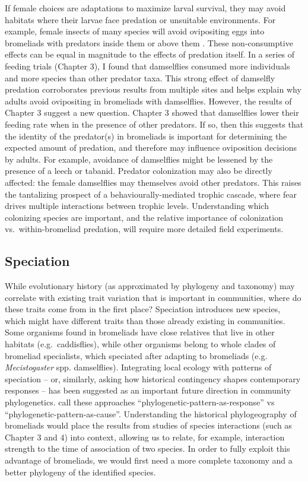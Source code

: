 If female choices are adaptations to maximize larval survival, they may
avoid habitats where their larvae face predation or unsuitable
environments. For example, female insects of many species will avoid
ovipositing eggs into bromeliads with predators inside them
\citep{hammill} or above them \citep{romero&srivastava}. These
non-consumptive effects can be equal in magnitude to the effects of
predation itself. In a series of feeding trials (Chapter 3), I found
that damselflies consumed more individuals and more species than other
predator taxa. This strong effect of damselfly predation corroborates
previous results from multiple sites \citep{ref} and helps explain why
adults avoid ovipositing in bromeliads with damselflies. However, the
results of Chapter 3 suggest a new question. Chapter 3 showed that
damselflies lower their feeding rate when in the presence of other
predators. If so, then this suggests that the identity of the
predator(s) in bromeliads is important for determining the expected
amount of predation, and therefore may influence oviposition decisions
by adults. For example, avoidance of damselflies might be lessened by
the presence of a leech or tabanid. Predator colonization may also be
directly affected: the female damselflies may themselves avoid other
predators. This raises the tantalizing prospect of a
behaviourally-mediated trophic cascade, where fear drives multiple
interactions between trophic levels. Understanding which colonizing
species are important, and the relative importance of colonization
vs.~within-bromeliad predation, will require more detailed field
experiments.

\subsection{Speciation}\label{speciation}

While evolutionary history (as approximated by phylogeny and taxonomy)
may correlate with existing trait variation that is important in
communities, where do these traits come from in the first place?
Speciation introduces new species, which might have different traits
than those already existing in communities. Some organisms found in
bromeliads have close relatives that live in other habitats
(e.g.~caddisflies), while other organisms belong to whole clades of
bromeliad specialists, which speciated after adapting to bromeliads
(e.g. \emph{Mecistogaster} spp. damselflies). Integrating local ecology
with patterns of speciation -- or, similarly, asking how historical
contingency shapes contemporary responses -- has been suggested as an
important future direction in community phylogenetics.
\citep{gerhold2015} call these approaches
``phylogenetic-pattern-as-response'' vs
``phylogenetic-pattern-as-cause''. Understanding the historical
phylogeography of bromeliads would place the results from studies of
species interactions (such as Chapter 3 and 4) into context, allowing us
to relate, for example, interaction strength to the time of association
of two species. In order to fully exploit this advantage of bromeliads,
we would first need a more complete taxonomy and a better phylogeny of
the identified species.

